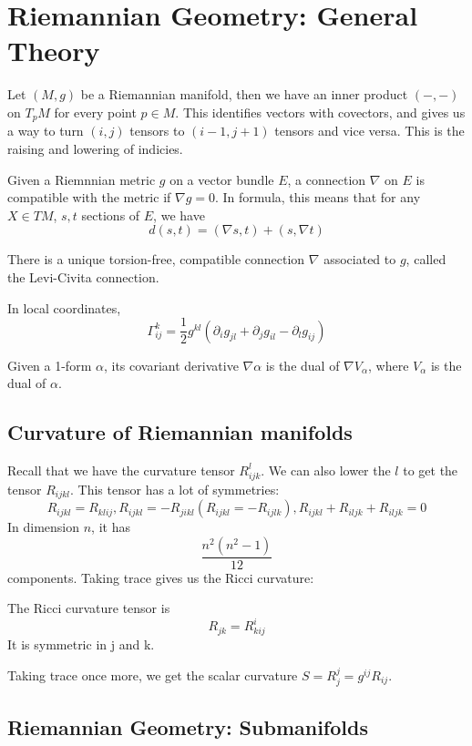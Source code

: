 \documentclass[main.tex]{subfiles}
\begin{document}
\section{Riemannian Geometry: General Theory}
Let $(M, g)$ be a Riemannian manifold, then we have an inner product 
$(-,-)$ on $T_p M$ for every point $p \in M$. This identifies vectors with covectors, and gives us a way to turn $(i, j)$ tensors to $(i-1, j+1)$ tensors and vice versa. This is the raising and lowering of indicies.

Given a Riemnnian metric $g$ on a vector bundle $E$, a connection $\nabla$ on $E$ is compatible with the metric if $\nabla g = 0$. In formula, this means that for any $X \in TM$, $s, t$ sections of $E$, we have 
$$
d(s,t) = (\nabla s, t) + (s, \nabla t)
$$

\begin{definition}
There is a unique torsion-free, compatible connection $\nabla$ associated to $g$, called the Levi-Civita connection.
\end{definition}
In local coordinates, 
$$
\Gamma_{ij}^k = \frac{1}{2} g^{kl}(\partial_i g_{jl} + \partial_j g_{il} - \partial_l g_{ij})
$$
\begin{remark}
Given a 1-form $\alpha$, its covariant derivative $\nabla \alpha$ is the dual of $\nabla V_\alpha$, where $V_\alpha$ is the dual of $\alpha$.
\end{remark}


\subsection{Curvature of Riemannian manifolds}
Recall that we have the curvature tensor $R_{ijk}^l$. We can also lower the $l$ to get the tensor $R_{ijkl}$. This tensor has a lot of symmetries:
$$
R_{ijkl} = R_{klij}, R_{ijkl} = -R_{jikl} (R_{ijkl} = - R_{ijlk}), R_{ijkl} + R_{iljk} + R_{iljk} = 0
$$
In dimension $n$, it has 
$$
\frac{n^2 (n^2 - 1)}{12}
$$
components.
Taking trace gives us the Ricci curvature:
\begin{definition}
The Ricci curvature tensor is 
$$
R_{jk} = R^i _{kij}
$$
It is symmetric in j and k. 
\end{definition}

Taking trace once more, we get the scalar curvature
$S = R^j _j = g^{ij} R_{ij}$.

\subsection{Riemannian Geometry: Submanifolds}
\end{document}
